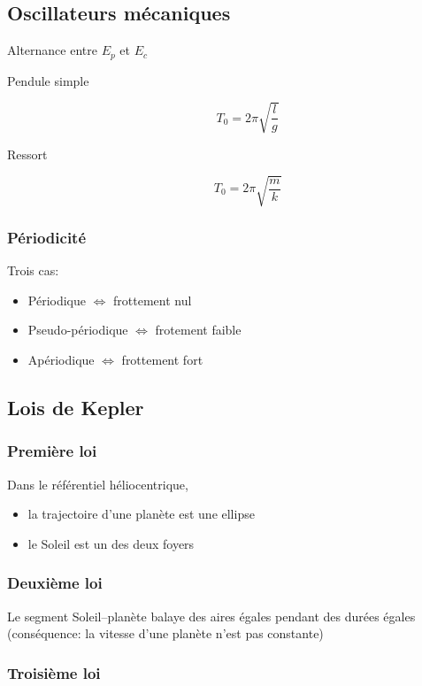 \documentclass{article}
\begin{document}
\subsection{Oscillateurs mécaniques}

Alternance entre $E_p$ et $E_c$

\begin{description}
    \item[Pendule simple] $$T_0 = 2\pi \sqrt{\frac{l}{g}}$$
    \item[Ressort] $$T_0 = 2\pi \sqrt{\frac{m}{k}}$$
\end{description}

\subsubsection{Périodicité}

Trois cas:

\begin{itemize}
    \item Périodique $\iff$ frottement nul
    \item Pseudo-périodique $\iff$ frotement faible
    \item Apériodique $\iff$ frottement fort
\end{itemize}
\subsection{Lois de Kepler}

\subsubsection{Première loi}
Dans le référentiel héliocentrique, 
\begin{itemize}
    \item la trajectoire d'une planète est une ellipse 
    \item le Soleil est un des deux foyers
\end{itemize}

\subsubsection{Deuxième loi}
Le segment Soleil--planète balaye des aires égales pendant des durées égales (conséquence: la vitesse d'une planète n'est pas constante)

\subsubsection{Troisième loi}
\end{document}
